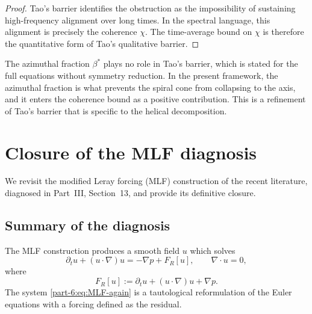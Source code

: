 \begin{proof}
Tao's barrier identifies the obstruction as the impossibility of 
sustaining high-frequency alignment over long times. In the 
spectral language, this alignment is precisely the coherence 
$\chi$. The time-average bound on $\chi$ is therefore the 
quantitative form of Tao's qualitative barrier.
\end{proof}

\begin{remark}\label{part-6:rem:azimuthal-Tao}
The azimuthal fraction $\beta^\ast$ plays no role in Tao's barrier, 
which is stated for the full equations without symmetry reduction. In 
the present framework, the azimuthal fraction is what prevents the 
spiral cone from collapsing to the axis, and it enters the 
coherence bound as a positive contribution. This is a refinement 
of Tao's barrier that is specific to the helical decomposition.
\end{remark}

\section{Closure of the MLF diagnosis}
\label{part-6:sec:MLF-closure}

We revisit the modified Leray forcing (MLF) construction of the 
recent literature, diagnosed in Part~III, Section~13, and provide 
its definitive closure.

\subsection{Summary of the diagnosis}
\label{part-6:ssec:MLF-summary}

The MLF construction produces a smooth field $u$ which solves
\begin{equation}\label{part-6:eq:MLF-again}
\partial_t u + (u\cdot\nabla)u = -\nabla p + F_R[u],
\qquad \nabla\cdot u = 0,
\end{equation}
where
\begin{equation}\label{part-6:eq:FR-again}
F_R[u] := \partial_t u + (u\cdot\nabla)u + \nabla p.
\end{equation}
The system \eqref{part-6:eq:MLF-again} is a tautological reformulation of 
the Euler equations with a forcing defined as the residual.

